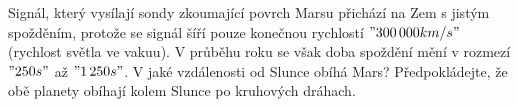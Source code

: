 %
%
{%
}%
{Signál, který vysílají sondy zkoumající povrch Marsu přichází na Zem s jistým
spožděním, protože se signál šíří pouze konečnou rychlostí $"300\,000 km/s"$
(rychlost světla ve vakuu). V průběhu roku se však doba spoždění mění
v rozmezí $"250 s"$ až $"1\,250 s"$. V jaké vzdálenosti od Slunce obíhá Mars?
Předpokládejte, že obě planety obíhají kolem Slunce po kruhových dráhach.
}%
{}%
{%
}%
{}%
